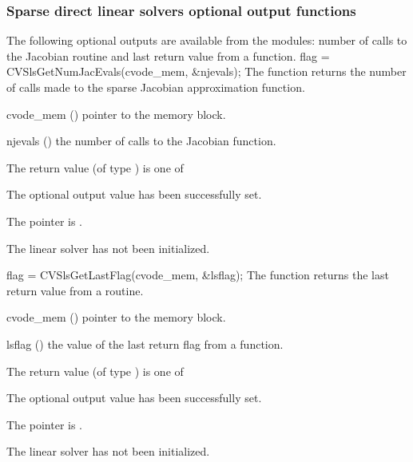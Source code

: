 \subsubsection{Sparse direct linear solvers optional output functions}
\label{sss:optout_sls}
The following optional outputs are available from the {\cvsls} modules:
number of calls to the Jacobian routine
and last return value from a {\cvsls} function.
{
  flag = CVSlsGetNumJacEvals(cvode\_mem, \&njevals);
}
{
  The function  returns the
  number of calls made to the {\cvsls} sparse
  Jacobian approximation function.
}
{
  \begin{args}
  \item[cvode\_mem] ()
    pointer to the {\cvode} memory block.
  \item[njevals] ()
    the number of calls to the Jacobian function.
  \end{args}
}
{
  The return value  (of type ) is one of
  \begin{args}
  \item[\Id{CVSLS\_SUCCESS}] 
    The optional output value has been successfully set.
  \item[\Id{CVSLS\_MEM\_NULL}]
    The  pointer is .
  \item[\Id{CVSLS\_LMEM\_NULL}]
    The {\cvsls} linear solver has not been initialized.
  \end{args}
}
{}
{
  flag = CVSlsGetLastFlag(cvode\_mem, \&lsflag);
}
{
  The function  returns the
  last return value from a {\cvsls} routine. 
}
{
  \begin{args}
  \item[cvode\_mem] ()
    pointer to the {\cvode} memory block.
  \item[lsflag] ()
    the value of the last return flag from a {\cvsls} function.
  \end{args}
}
{
  The return value  (of type ) is one of
  \begin{args}
  \item[\Id{CVSLS\_SUCCESS}] 
    The optional output value has been successfully set.
  \item[\Id{CVSLS\_MEM\_NULL}]
    The  pointer is .
  \item[\Id{CVSLS\_LMEM\_NULL}]
    The {\cvsls} linear solver has not been initialized.
  \end{args}
}

